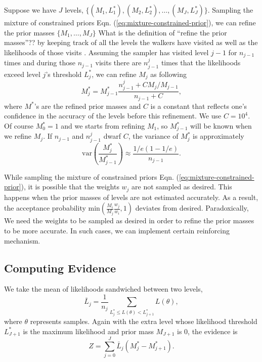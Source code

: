 \documentclass[letterpaper, preprint]{aastex}
\newcommand{\qer}[1]{{\color{red}#1}}
\begin{document}
Suppose we have $J$ levels, $\{(M_1,L_1^*),(M_2,L_2^*), \ldots,(M_J,L_J^*)\}$. Sampling the mixture of constrained priors Eqn. (\ref{eq:mixture-constrained-prior}), we can refine the prior masses 
$\{M_1,\dots,M_J\}$ \qer{What is the definition of ``refine the prior masses''??} by keeping track of all the levels the walkers have visited as well as the likelihoods of those visits . Assuming the sampler has visited level $j-1$ for $n_{j-1}$ times and during those $n_{j-1}$ visits there are $n_{j-1}^j$ times that the likelihoods exceed level $j$'s threshold $L^*_j$, we can refine $M_j$ as following \citep{brewer11a}
\begin{equation}
M^*_j = M^*_{j-1}\frac{n_{j-1}^j+C M_j/M_{j-1}}{n_{j-1}+C},
\end{equation}
where $M^*$'s are the refined prior masses and $C$ is a constant that reflects one's confidence in the accuracy of the levels before this refinement. We use $C=10^4$. Of course $M^*_0=1$ and we starts from refining $M_1$, so $M^*_{j-1}$ will be known when we refine $M_j$. If $n_{j-1}$ and $n_{j-1}^j$ dwarf $C$, the variance of $M^*_j$ is approximately
\begin{equation}
\mathrm{var}\left(\frac{M^*_j}{M^*_{j-1}}\right)\approx\frac{1/e(1-1/e)}{n_{j-1}}.
\end{equation}

While sampling the mixture of constrained priors Eqn. (\ref{eq:mixture-constrained-prior}), it is possible that the weights $w_j$ are not sampled as desired. This happens when the prior masses of levels are not estimated accurately. As a result, the acceptance probability $\mathrm{min}\left(\frac{M_i}{M_j}\frac{w_j}{w_i},1\right)$ deviates from desired. Paradoxically, We need the weights to be sampled as desired in order to refine the prior masses to be more accurate. In such cases, we can implement certain reinforcing mechanism. \citep{brewer11a}

\subsection{Computing Evidence}
We take the mean of likelihoods sandwiched between two levels,
\begin{equation}
\bar{L}_j= \frac{1}{n_j}\sum_{L_j^*\leq L(\theta)<L_{j+1}^*} L(\theta),
\end{equation}
where $\theta$ represents samples. Again with the extra level whose likelihood threshold $L^*_{J+1}$ is the maximum likelihood and prior mass $M_{J+1}$ is 0, the evidence is
\begin{equation}
Z = \sum_{j=0}^{J} \bar{L}_j (M^*_j - M^*_{j+1}).
\end{equation}
\end{document}
